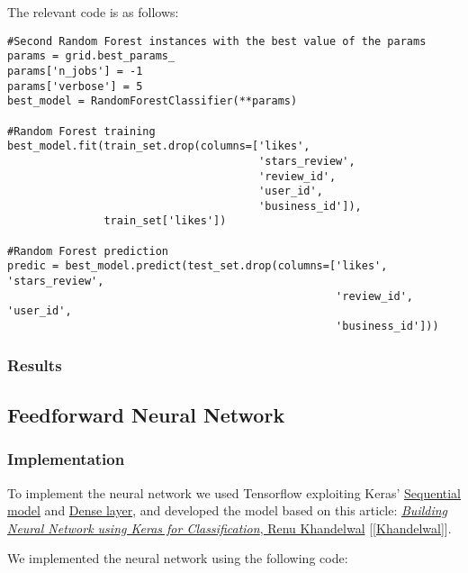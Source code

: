 The relevant code is as follows:

\begin{lstlisting}[caption={Random Forest training and predictions}, label={lst:rf-fit}]
#Second Random Forest instances with the best value of the params
params = grid.best_params_
params['n_jobs'] = -1
params['verbose'] = 5
best_model = RandomForestClassifier(**params)

#Random Forest training
best_model.fit(train_set.drop(columns=['likes', 
                                       'stars_review', 
                                       'review_id', 
                                       'user_id', 
                                       'business_id']),
               train_set['likes'])

#Random Forest prediction 
predic = best_model.predict(test_set.drop(columns=['likes', 'stars_review',
                                                   'review_id', 'user_id', 
                                                   'business_id']))
\end{lstlisting}


\subsubsection{Results}



\subsection{Feedforward Neural Network}

\subsubsection{Implementation}

To implement the neural network we used Tensorflow exploiting Keras' \href{https://www.tensorflow.org/api_docs/python/tf/keras/Sequential}{Sequential model} and \href{https://www.tensorflow.org/api_docs/python/tf/keras/layers/Dense}{Dense layer}, and developed the model based on this article: \href{https://medium.com/datadriveninvestor/building-neural-network-using-keras-for-classification-3a3656c726c1}{\textit{Building Neural Network using Keras for Classification}, Renu Khandelwal} [\ref{Khandelwal}].

We implemented the neural network using the following code:

